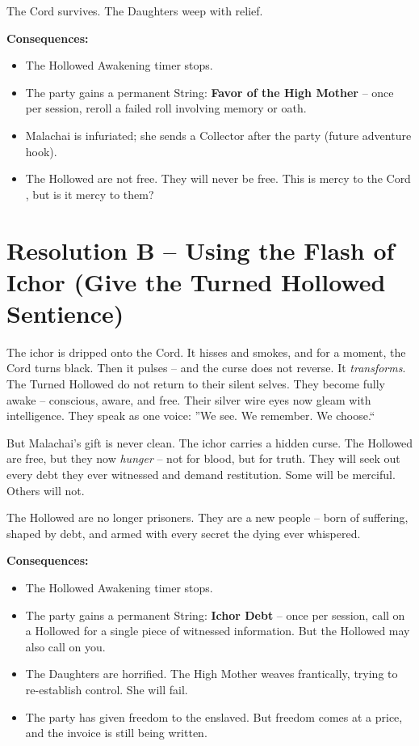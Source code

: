 \documentclass[10pt,twoside]{book}
\begin{document}
The Cord survives. The Daughters weep with relief.

\textbf{Consequences:}
\begin{itemize}
\item The Hollowed Awakening timer stops.
\item The party gains a permanent String: \textbf{Favor of the High Mother} -- once per session, reroll a failed roll involving memory or oath.
\item Malachai is infuriated; she sends a Collector after the party (future adventure hook).
\item The Hollowed are not free. They will never be free. This is mercy to the Cord , but is it mercy to them?
\end{itemize}

\section{Resolution B -- Using the Flash of Ichor (Give the Turned Hollowed Sentience)}
The ichor is dripped onto the Cord. It hisses and smokes, and for a moment, the Cord turns black. Then it pulses -- and the curse does not reverse. It \textit{transforms}. The Turned Hollowed do not return to their silent selves. They become fully awake -- conscious, aware, and free. Their silver wire eyes now gleam with intelligence. They speak as one voice: ''We see. We remember. We choose.``

But Malachai's gift is never clean. The ichor carries a hidden curse. The Hollowed are free, but they now \textit{hunger} -- not for blood, but for truth. They will seek out every debt they ever witnessed and demand restitution. Some will be merciful. Others will not.

The Hollowed are no longer prisoners. They are a new people -- born of suffering, shaped by debt, and armed with every secret the dying ever whispered.

\textbf{Consequences:}
\begin{itemize}
\item The Hollowed Awakening timer stops.
\item The party gains a permanent String: \textbf{Ichor Debt} -- once per session, call on a Hollowed for a single piece of witnessed information. But the Hollowed may also call on you.
\item The Daughters are horrified. The High Mother weaves frantically, trying to re-establish control. She will fail.
\item The party has given freedom to the enslaved. But freedom comes at a price, and the invoice is still being written.
\end{itemize}
\end{document}
